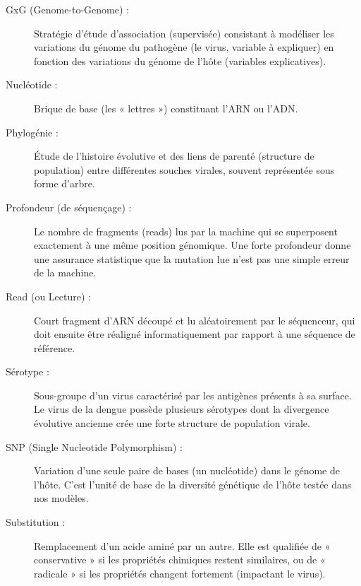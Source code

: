 \documentclass[11pt,a4paper]{article}
\begin{document}
\begin{description}
    \item[GxG (Genome-to-Genome) :] Stratégie d'étude d'association (supervisée) consistant à modéliser les variations du génome du pathogène (le virus, variable à expliquer) en fonction des variations du génome de l'hôte (variables explicatives).
    
    \item[Nucléotide :] Brique de base (les « lettres ») constituant l'ARN ou l'ADN.
    
    \item[Phylogénie :] Étude de l'histoire évolutive et des liens de parenté (structure de population) entre différentes souches virales, souvent représentée sous forme d'arbre.
    
    \item[Profondeur (de séquençage) :] Le nombre de fragments (reads) lus par la machine qui se superposent exactement à une même position génomique. Une forte profondeur donne une assurance statistique que la mutation lue n'est pas une simple erreur de la machine.
    
    \item[Read (ou Lecture) :] Court fragment d'ARN découpé et lu aléatoirement par le séquenceur, qui doit ensuite être réaligné informatiquement par rapport à une séquence de référence.
    
    \item[Sérotype :] Sous-groupe d'un virus caractérisé par les antigènes présents à sa surface. Le virus de la dengue possède plusieurs sérotypes dont la divergence évolutive ancienne crée une forte structure de population virale.
    
    \item[SNP (Single Nucleotide Polymorphism) :] Variation d'une seule paire de bases (un nucléotide) dans le génome de l'hôte. C'est l'unité de base de la diversité génétique de l'hôte testée dans nos modèles.
    
    \item[Substitution :] Remplacement d'un acide aminé par un autre. Elle est qualifiée de « conservative » si les propriétés chimiques restent similaires, ou de « radicale » si les propriétés changent fortement (impactant le virus).

\end{description}

\newpage
\nocite{*}
\printbibliography
\end{document}

